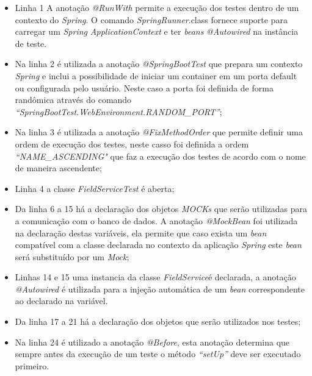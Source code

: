 \begin{itemize}
\item Linha 1 A anotação \textit{@RunWith} permite a execução dos testes dentro de um contexto do \textit{Spring}. O comando \textit{SpringRunner}.class fornece suporte para carregar um \textit{Spring} \textit{ApplicationContext} e ter \textit{beans }\textit{@Autowired} na instância de teste.
\item Na linha 2 é utilizada a anotação \textit{@SpringBootTest} que prepara um contexto \textit{Spring} e inclui a possibilidade de iniciar um container em um porta default ou configurada pelo usuário. Neste caso a porta foi definida de forma randômica através do comando \textit{“SpringBootTest.WebEnvironment.RANDOM\_PORT”}; 

 \item Na linha 3 é utilizada a anotação \textit{@FixMethodOrder} que permite definir uma ordem de execução dos testes, neste casso foi definida a ordem \textit{“NAME\_ASCENDING"} que faz a execução dos testes de acordo com o nome de maneira ascendente;

 \item Linha 4 a classe \textit{FieldServiceTest} é aberta;

 \item Da linha 6 a 15 há a declaração dos objetos \textit{MOCKs} que serão utilizadas para a comunicação com o banco de dados. A anotação \textit{@MockBean} foi utilizada na declaração destas variáveis, ela permite que caso exista um \textit{bean }compatível com a classe declarada no contexto da aplicação \textit{Spring} este \textit{bean }será substituído por um \textit{Mock};

\item Linhas 14 e 15 uma instancia da classe \textit{FieldService}é declarada, a anotação \textit{@Autowired} é utilizada para a injeção automática de um \textit{bean }correspondente ao declarado na variável.
 
\item Da linha 17 a 21 há a declaração dos objetos que serão utilizados nos testes;

 



\item Na linha 24 é utilizado a anotação \textit{@Before}, esta anotação determina que sempre antes da execução de um teste o método \textit{“setUp”} deve ser executado primeiro.



\end{itemize}

